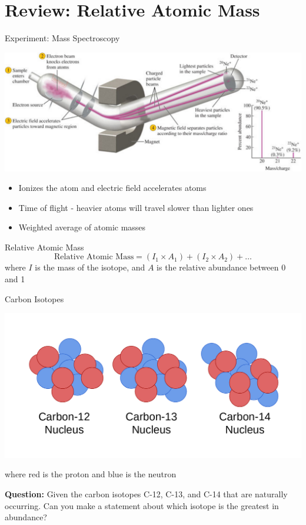 \documentclass[11pt]{beamer}
\begin{document}
\section{Review: Relative Atomic Mass}

\begin{frame}{Experiment: Mass Spectroscopy}
  \begin{center}
    \includegraphics[width=\linewidth]{mass_spect}
  \end{center}

  \begin{itemize}
  \item Ionizes the atom and electric field accelerates atoms
  \item Time of flight - heavier atoms will travel slower
    than lighter ones
  \item Weighted average of atomic masses
  \end{itemize}  
\end{frame}

\begin{frame}{Relative Atomic Mass}
  \begin{equation}
    \text{Relative Atomic Mass} = (I_1\times A_1) + (I_2\times A_2) + \dots
  \end{equation}
  where $I$ is the mass of the isotope, and $A$ is the
  relative abundance between 0 and 1
\end{frame}

\begin{frame}{Carbon Isotopes}
  \begin{center}
    \includegraphics[scale=0.2]{carbon_isotopes}
  \end{center}
  where red is the proton and blue is the neutron
  
  \textbf{Question:} Given the carbon isotopes C-12, C-13, and C-14
  that are naturally occurring. Can you make a statement about which
  isotope is the greatest in abundance?
\end{frame}
\end{document}
